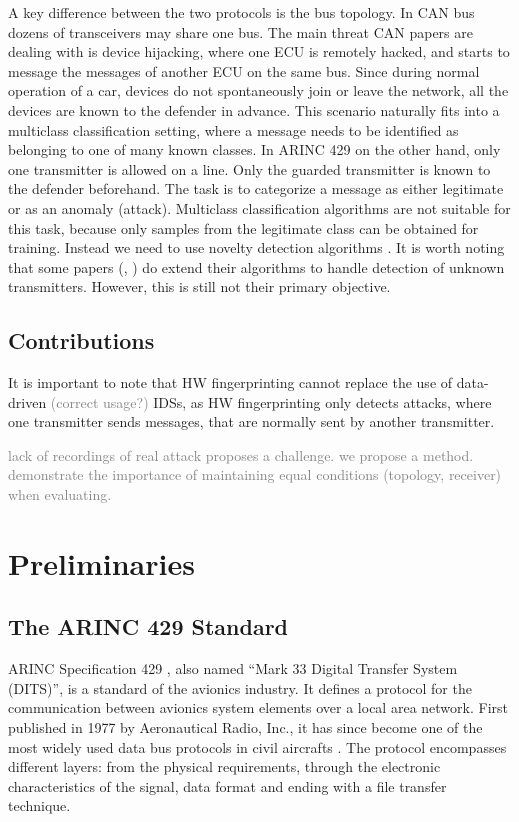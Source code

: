 \documentclass[conference]{IEEEtran}
\begin{document}
  A key difference between the two protocols is the bus topology. In CAN bus dozens of transceivers may share one bus. The main threat CAN papers are dealing with is device hijacking, where one ECU is remotely hacked, and starts to message the messages of another ECU on the same bus. Since during normal operation of a car, devices do not spontaneously join or leave the network, all the devices are known to the defender in advance. This scenario naturally fits into a multiclass classification setting, where a message needs to be identified as belonging to one of many known classes. In ARINC 429 on the other hand, only one transmitter is allowed on a line. Only the guarded transmitter is known to the defender beforehand. The task is to categorize a message as either legitimate or as an anomaly (attack). Multiclass classification algorithms are not suitable for this task, because only samples from the legitimate class can be obtained for training. Instead we need to use novelty detection algorithms \cite{pimentel2014review}. It is worth noting that some papers (\cite{choi2018identifying}, \cite{choi2018voltageids}) do extend their algorithms to handle detection of unknown transmitters. However, this is still not their primary objective.
  
\subsection{Contributions}
  It is important to note that HW fingerprinting cannot replace the use of data-driven \textcolor{gray}{(correct usage?)} IDSs, as HW fingerprinting only detects attacks, where one transmitter sends messages, that are normally sent by another transmitter.
  
  \textcolor{gray}{lack of recordings of real attack proposes a challenge. we propose a method. demonstrate the importance of maintaining equal conditions (topology, receiver) when evaluating.}

\section{Preliminaries}
\subsection{The ARINC 429 Standard}
  ARINC Specification 429 \cite{}, also named ``Mark 33 Digital Transfer System (DITS)'', is a standard of the avionics industry. It defines a protocol for the communication between avionics system elements over a local area network. First published in 1977 by Aeronautical Radio, Inc., it has since become one of the most widely used data bus protocols in civil aircrafts \cite{}. The protocol encompasses different layers: from the physical requirements, through the electronic characteristics of the signal, data format and ending with a file transfer technique.
\end{document}
